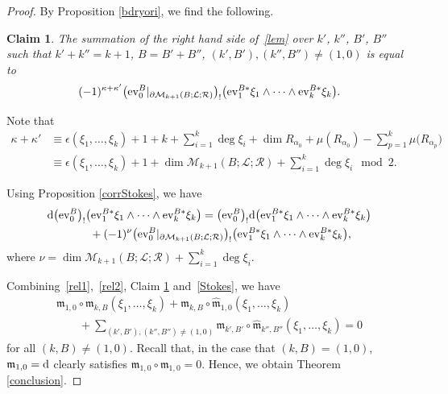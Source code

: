 \documentclass[10pt,a4paper]{article}
\numberwithin{equation}{section}
\newtheorem{clm}[thm]{Claim}
\theoremstyle{definition}
\begin{document}
\begin{proof}
By Proposition \ref{bdryori}, we find the following.

\begin{clm}\label{rel3}
The summation of the right hand side of~\eqref{lem} over $k'$, $k''$, $B'$, $B''$ such that
${k' + k'' = k+1}$, $B=B' + B''$, $(k', B'), (k'', B'') \neq (1,0)$ is equal to
\[ (-1)^{\kappa + \kappa'} \bigl({\rm ev}^B_0\vert_{\partial {\mathcal M}_{k+1}(B;{\mathcal L}; {\mathcal R})}\bigr)_! \bigl({\rm ev}_1^{B*}\xi_1 \wedge \dots\wedge {\rm ev}_k^{B*} \xi_k\bigr).\]
\end{clm}

Note that
\begin{align*}
\kappa + \kappa' &{} \equiv \epsilon(\xi_1 ,\dots, \xi_k) + 1 + k + \sum_{i=1}^k \deg \xi_i + \dim R_{\alpha_0} + \mu(R_{\alpha_0}) - \sum_{p=1}^k
\mu\bigl(R_{\alpha_p}\bigr)  \\
&{} \equiv \epsilon(\xi_1 ,\dots, \xi_k) + 1 + \dim {\mathcal M}_{k+1}(B;{\mathcal L};{\mathcal R}) + \sum_{i=1}^k \deg \xi_i \mod 2 .
\end{align*}

Using Proposition \ref{corrStokes}, we have
\begin{gather}
{\rm d} \bigl({\rm ev}_0^B\bigr)_!\bigl({\rm ev}_1^{B*}\xi_1 \wedge \dots \wedge {\rm ev}_k^{B*}\xi_k\bigr)  =  \bigl({\rm ev}_0^B\bigr)_! {\rm d}\bigl({\rm ev}_1^{B*}\xi_1 \wedge \dots \wedge {\rm ev}_k^{B*} \xi_k\bigr) \nonumber \\
\qquad{} + (-1)^\nu \bigl({\rm ev}_0^B\vert_{\partial {\mathcal M}_{k+1}(B;{\mathcal L};{\mathcal R})}\bigr)_!
\bigl({\rm ev}_1^{B*} \xi_1 \wedge \dots \wedge {\rm ev}_k^{B*}\xi_k\bigr),\label{Stokes}
\end{gather}
where $\nu = \dim {\mathcal M}_{k+1}(B;{\mathcal L};{\mathcal R}) + \sum_{i=1}^k \deg \xi_i.$

Combining~\eqref{rel1},~\eqref{rel2}, Claim \ref{rel3} and~\eqref{Stokes}, we have
\begin{gather*}
 {\mathfrak m}_{1,0} \circ {\mathfrak m}_{k, B} (\xi_1, \dots, \xi_k) + {\mathfrak m}_{k,B} \circ \hat{\mathfrak m}_{1,0} (\xi_1, \dots, \xi_k)  \\
\qquad{} + \sum_{(k',B'), (k'', B'') \neq (1,0)} {\mathfrak m}_{k',B'} \circ \hat{\mathfrak m}_{k'',B''} (\xi_1, \dots, \xi_k) = 0
\end{gather*}
for all $(k,B) \neq (1,0)$.
Recall that, in the case that $(k, B) = (1,0)$, ${\mathfrak m}_{1,0}= {\rm d}$ clearly satisfies ${\mathfrak m}_{1,0} \circ {\mathfrak m}_{1,0} = 0$.
Hence, we obtain Theorem \ref{conclusion}.
\end{proof}
\end{document}
